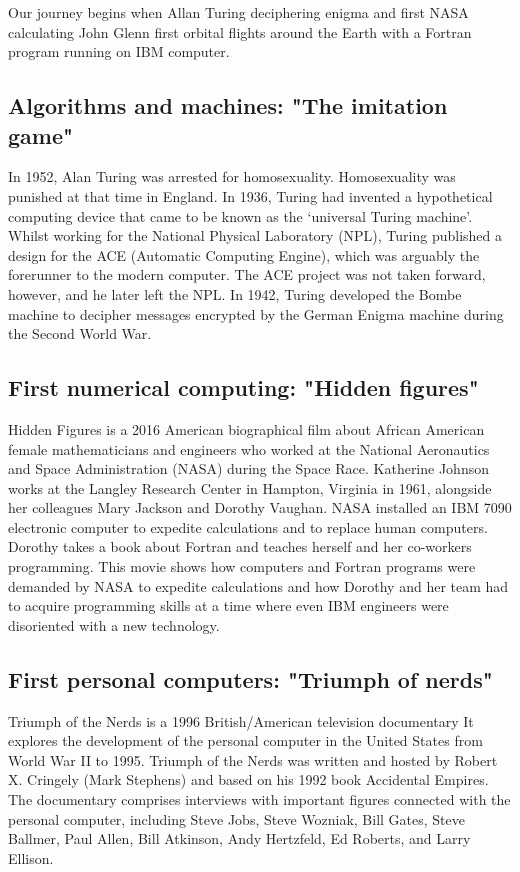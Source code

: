 Our journey begins when Allan Turing deciphering enigma and first NASA calculating 
John Glenn first orbital flights around the Earth with a Fortran program running on IBM computer. 
  
  

  \newpage 
\subsection*{Algorithms and machines: "The imitation game"} 
 In 1952, Alan Turing was arrested for homosexuality. 
 Homosexuality was punished at that time in England. 
 In 1936, Turing had invented a hypothetical computing device that came to be known 
 as the ‘universal Turing machine’. 
 Whilst working for the National Physical Laboratory (NPL), 
 Turing published a design for the ACE (Automatic Computing Engine), which was 
 arguably the forerunner to the modern computer. 
 The ACE project was not taken forward, however, and he later left the NPL. 
 In 1942,  Turing developed the Bombe machine to decipher messages encrypted by the German Enigma 
 machine during the Second World War. 
 
   
   

\subsection*{First numerical computing: "Hidden figures"}
 Hidden Figures is a 2016 American biographical  film 
 about African American female mathematicians and engineers 
 who worked at the National Aeronautics and Space Administration (NASA) 
 during the Space Race.
 Katherine Johnson works at the Langley Research Center in Hampton, Virginia in 1961, 
 alongside her colleagues Mary Jackson and Dorothy Vaughan. 
 NASA installed an IBM 7090 electronic computer to expedite calculations and to replace human computers. 
 Dorothy takes a book about Fortran and teaches herself and her co-workers programming. 
 This movie shows how computers and Fortran programs were demanded by NASA
 to expedite calculations and how Dorothy and her team had to acquire programming skills 
 at a time where even IBM engineers were disoriented with a new technology. 
 
  
   
  

\subsection*{First personal computers: "Triumph of nerds"}
 Triumph of the Nerds is a 1996 British/American television documentary
 It explores the development of the personal computer in the United States from World War II to 1995. 
 Triumph of the Nerds was written and hosted by Robert X. Cringely (Mark Stephens) 
 and based on his 1992 book Accidental Empires. 
 The documentary comprises interviews with important figures connected with the personal computer, 
 including Steve Jobs, Steve Wozniak, Bill Gates, Steve Ballmer, Paul Allen, Bill Atkinson, 
 Andy Hertzfeld, Ed Roberts, and Larry Ellison. 
 
